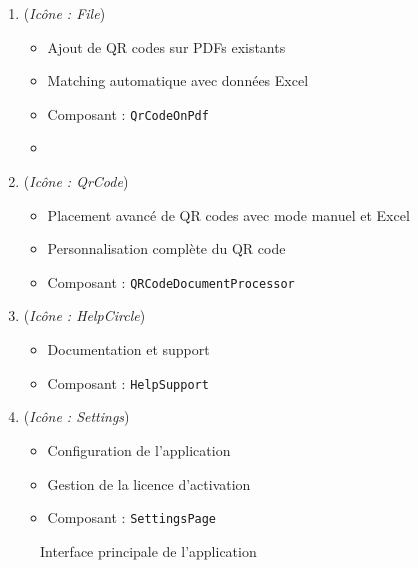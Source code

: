 \begin{enumerate}[leftmargin=*]
    \item {} (\textit{Icône : File})
    \begin{itemize}
        \item Ajout de QR codes sur PDFs existants
        \item Matching automatique avec données Excel
        \item Composant : \texttt{QrCodeOnPdf}
        \item {}
    \end{itemize}

    \item {} (\textit{Icône : QrCode})
    \begin{itemize}
        \item Placement avancé de QR codes avec mode manuel et Excel
        \item Personnalisation complète du QR code
        \item Composant : \texttt{QRCodeDocumentProcessor}
    \end{itemize}

    \item {} (\textit{Icône : HelpCircle})
    \begin{itemize}
        \item Documentation et support
        \item Composant : \texttt{HelpSupport}
    \end{itemize}

    \item {} (\textit{Icône : Settings})
    \begin{itemize}
        \item Configuration de l'application
        \item Gestion de la licence d'activation
        \item Composant : \texttt{SettingsPage}
    \end{itemize}
\end{enumerate}

\begin{figure}[h]
    \centering
    \caption{Interface principale de l'application}
\end{figure}

